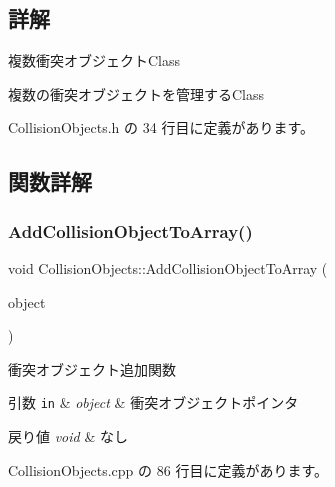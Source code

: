 \subsection{詳解}
複数衝突オブジェクト\+Class 

複数の衝突オブジェクトを管理する\+Class 

 Collision\+Objects.\+h の 34 行目に定義があります。



\subsection{関数詳解}
\mbox{\label{class_collision_objects_a50d6593f98cd04e23ad7ea9102eccc3c}} 
\subsubsection{\texorpdfstring{Add\+Collision\+Object\+To\+Array()}{AddCollisionObjectToArray()}}
{\footnotesize\ttfamily void Collision\+Objects\+::\+Add\+Collision\+Object\+To\+Array (\begin{DoxyParamCaption}\item[{\mbox{\hyperlink{class_collision_object}{Collision\+Object}} $\ast$}]{object }\end{DoxyParamCaption})}



衝突オブジェクト追加関数 


\begin{DoxyParams}[1]{引数}
\mbox{\tt in}  & {\em object} & 衝突オブジェクトポインタ \\
\hline
\end{DoxyParams}

\begin{DoxyRetVals}{戻り値}
{\em void} & なし \\
\hline
\end{DoxyRetVals}


 Collision\+Objects.\+cpp の 86 行目に定義があります。

\mbox{\label{class_collision_objects_a309eef4695b4a19f389eaf5d0753c256}} 
